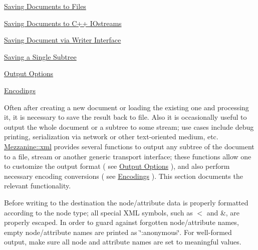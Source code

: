 \begin{DoxyItemize}
\item \hyperlink{XMLManual_XMLSavingFile}{Saving Documents to Files}
\item \hyperlink{XMLManual_XMLSavingStreams}{Saving Documents to C++ IOstreams}
\item \hyperlink{XMLManual_XMLSavingWriter}{Saving Document via Writer Interface}
\item \hyperlink{XMLManual_XMLSavingSubtree}{Saving a Single Subtree}
\item \hyperlink{XMLManual_XMLSavingOptions}{Output Options}
\item \hyperlink{XMLManual_XMLSavingEncodings}{Encodings}
\end{DoxyItemize}

Often after creating a new document or loading the existing one and processing it, it is necessary to save the result back to file. Also it is occasionally useful to output the whole document or a subtree to some stream; use cases include debug printing, serialization via network or other text-\/oriented medium, etc. \hyperlink{namespaceMezzanine_1_1xml}{Mezzanine::xml} provides several functions to output any subtree of the document to a file, stream or another generic transport interface; these functions allow one to customize the output format ( see \hyperlink{XMLManual_XMLSavingOptions}{Output Options} ), and also perform necessary encoding conversions ( see \hyperlink{XMLManual_XMLSavingEncodings}{Encodings} ). This section documents the relevant functionality. \par
 \par
 Before writing to the destination the node/attribute data is properly formatted according to the node type; all special XML symbols, such as $<$ and \&, are properly escaped. In order to guard against forgotten node/attribute names, empty node/attribute names are printed as \char`\"{}:anonymous\char`\"{}. For well-\/formed output, make sure all node and attribute names are set to meaningful values. \par
 \par
